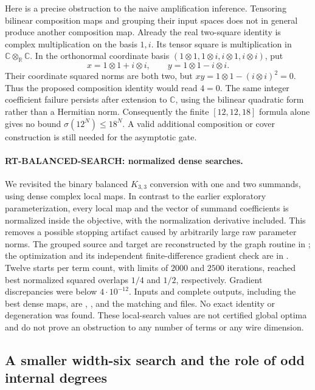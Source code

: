 Here is a precise obstruction to the naive amplification inference.
Tensoring bilinear composition maps and grouping their input spaces
does not in general produce another composition map. Already the
real two-square identity is complex multiplication on the basis
$1,i$. Its tensor square is multiplication in
$\mathbb C\otimes_{\mathbb R}\mathbb C$. In the orthonormal
coordinate basis $(1\otimes1,1\otimes i,i\otimes1,i\otimes i)$,
put
\[
 x=1\otimes1+i\otimes i,\qquad
 y=1\otimes1-i\otimes i.
\]
Their coordinate squared norms are both two, but
$xy=1\otimes1-(i\otimes i)^2=0$. Thus the proposed composition
identity would read $4=0$. The same integer coefficient failure
persists after extension to $\mathbb C$, using the bilinear
quadratic form rather than a Hermitian norm. Consequently the
finite $[12,12,18]$ formula alone gives no bound
$\sigma(12^N)\le18^N$. A valid additional composition or cover
construction is still needed for the asymptotic gate.

\paragraph{RT-BALANCED-SEARCH: normalized dense searches.}
We revisited the binary balanced $K_{3,3}$ conversion with one and
two summands, using dense complex local maps. In contrast to the
earlier exploratory parameterization, every local map and the vector
of summand coefficients is normalized inside the objective, with the
normalization derivative included. This removes a possible stopping
artifact caused by arbitrarily large raw parameter norms.
The grouped source and target are reconstructed by the graph routine
in ; the optimization and its
independent finite-difference gradient check are in
.
Twelve starts per term count, with limits of $2000$ and $2500$
iterations, reached best normalized squared overlaps $1/4$ and $1/2$,
respectively. Gradient discrepancies were below $4\cdot10^{-12}$.
Inputs and complete outputs, including the best dense maps, are
,
, and the matching
 and
 files.
No exact identity or degeneration was found. These local-search
values are not certified global optima and do not prove an obstruction
to any number of terms or any wire dimension.

\subsection{A smaller width-six search and the role of odd internal degrees}

